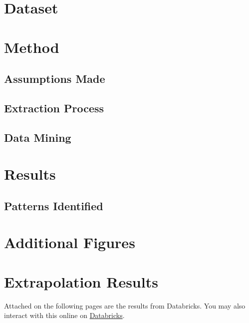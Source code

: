 \documentclass[12pt,titlepage]{article}
\begin{document}
\section{Dataset}

\section{Method}

\subsection{Assumptions Made}

\subsection{Extraction Process}

\subsection{Data Mining}

\section{Results}

\subsection{Patterns Identified}




\newpage
\appendix

\section{Additional Figures}

\clearpage


\section{Extrapolation Results}
\label{apx:results}

Attached on the following pages are the results from Databricks. You may also interact with this online on \href{https://databricks-prod-cloudfront.cloud.databricks.com/public/4027ec902e239c93eaaa8714f173bcfc/7364378259770565/3552971541306612/8155742302574378/latest.html}{Databricks}.
\end{document}

